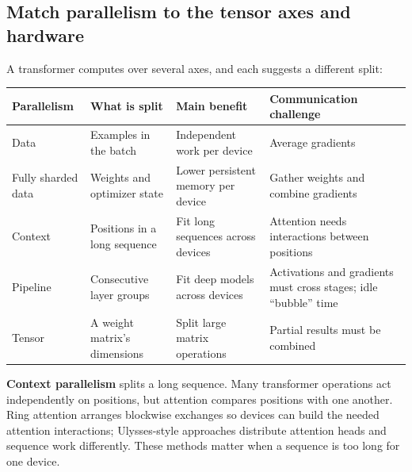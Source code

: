 \subsection{Match parallelism to the tensor axes and hardware}\label{04-visual-computing-ii-ch031-match-parallelism-to-the-tensor-axes-and-hardware}

A transformer computes over several axes, and each suggests a different split:

{\def\LTcaptype{none} %
\begin{longtable}[]{@{}
  >{\raggedright\arraybackslash}p{}
  >{\raggedright\arraybackslash}p{}
  >{\raggedright\arraybackslash}p{}
  >{\raggedright\arraybackslash}p{}@{}}
\toprule\noalign{}
\begin{minipage}[b]{\linewidth}\raggedright
Parallelism
\end{minipage} & \begin{minipage}[b]{\linewidth}\raggedright
What is split
\end{minipage} & \begin{minipage}[b]{\linewidth}\raggedright
Main benefit
\end{minipage} & \begin{minipage}[b]{\linewidth}\raggedright
Communication challenge
\end{minipage} \\
\midrule\noalign{}
\endhead
\bottomrule\noalign{}
\endlastfoot
Data & Examples in the batch & Independent work per device & Average gradients \\
Fully sharded data & Weights and optimizer state & Lower persistent memory per device & Gather weights and combine gradients \\
Context & Positions in a long sequence & Fit long sequences across devices & Attention needs interactions between positions \\
Pipeline & Consecutive layer groups & Fit deep models across devices & Activations and gradients must cross stages; idle ``bubble'' time \\
Tensor & A weight matrix's dimensions & Split large matrix operations & Partial results must be combined \\
\end{longtable}
}

\textbf{Context parallelism} splits a long sequence. Many transformer operations act independently on positions, but attention compares positions with one another. Ring attention arranges blockwise exchanges so devices can build the needed attention interactions; Ulysses-style approaches distribute attention heads and sequence work differently. These methods matter when a sequence is too long for one device.

